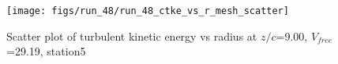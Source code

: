 \begin{figure}[H]
\centering
\texttt{[image: figs/run\_48/run\_48\_ctke\_vs\_r\_mesh\_scatter]}
\caption{Scatter plot of turbulent kinetic energy vs radius at $z/c$=9.00, $V_{free}$=29.19, station5}
\label{fig:run_48_ctke_vs_r_mesh_scatter}
\end{figure}


